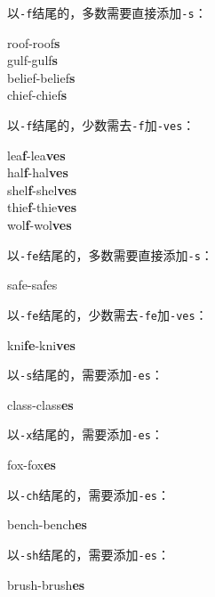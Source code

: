 \documentclass[UTF8]{ctexart}
\begin{document}
\newpage

    以\texttt{-f\hspace{2pt}}结尾的，多数需要直接添加\texttt{-s}：
    \begin{center}
        \ttfamily
        roof-roof\textbf{s}\\[3mm]
        gulf-gulf\textbf{s}\\[3mm]
        belief-belief\textbf{s}\\[3mm]
        chief-chief\textbf{s}\\[6mm]
    \end{center}
    以\texttt{-f\hspace{2pt}}结尾的，少数需去\texttt{-f}加\texttt{-ves}：
    \begin{center}
        \ttfamily
        lea\textbf{f}-lea\textbf{ves}\\[3mm]
        hal\textbf{f}-hal\textbf{ves}\\[3mm]
        shel\textbf{f}-shel\textbf{ves}\\[3mm]
        thie\textbf{f}-thie\textbf{ves}\\[3mm]
        wol\textbf{f}-wol\textbf{ves}\\[6mm]
    \end{center}
    以\texttt{-fe\hspace{2pt}}结尾的，多数需要直接添加\texttt{-s}：
    \begin{center}
        \ttfamily
        safe-safe{s}\\[6mm]
    \end{center}
    以\texttt{-fe\hspace{2pt}}结尾的，少数需去\texttt{-fe}加\texttt{-ves}：
    \begin{center}
        \ttfamily
        kni\textbf{fe}-kni\textbf{ves}\\[6mm]
    \end{center}
    以\texttt{-s\hspace{2pt}}结尾的，需要添加\texttt{-es\hspace{2pt}}：
    \begin{center}
        \ttfamily
        class-class\textbf{es}\\[6mm]
    \end{center}
    以\texttt{-x\hspace{2pt}}结尾的，需要添加\texttt{-es\hspace{2pt}}：
    \begin{center}
        \ttfamily
        fox-fox\textbf{es}\\[6mm]
    \end{center}
    以\texttt{-ch\hspace{2pt}}结尾的，需要添加\texttt{-es\hspace{2pt}}：
    \begin{center}
        \ttfamily
        bench-bench\textbf{es}\\[6mm]
    \end{center}
    以\texttt{-sh\hspace{2pt}}结尾的，需要添加\texttt{-es\hspace{2pt}}：
    \begin{center}
        \ttfamily
        brush-brush\textbf{es}
    \end{center}
\end{document}
